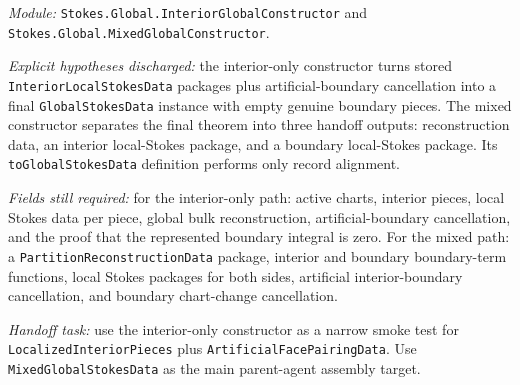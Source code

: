 \begin{definition}
  \label{anc:m6_interior_mixed_constructors}
  \leanok
  \emph{Module:} \texttt{Stokes.Global.InteriorGlobalConstructor} and
  \texttt{Stokes.Global.MixedGlobalConstructor}.

  \emph{Explicit hypotheses discharged:}
  the interior-only constructor turns stored \texttt{InteriorLocalStokesData}
  packages plus artificial-boundary cancellation into a final
  \texttt{GlobalStokesData} instance with empty genuine boundary pieces.  The
  mixed constructor separates the final theorem into three handoff outputs:
  reconstruction data, an interior local-Stokes package, and a boundary
  local-Stokes package.  Its \texttt{toGlobalStokesData} definition performs
  only record alignment.

  \emph{Fields still required:}
  for the interior-only path: active charts, interior pieces, local Stokes data
  per piece, global bulk reconstruction, artificial-boundary cancellation, and
  the proof that the represented boundary integral is zero.  For the mixed
  path: a \texttt{PartitionReconstructionData} package, interior and boundary
  boundary-term functions, local Stokes packages for both sides, artificial
  interior-boundary cancellation, and boundary chart-change cancellation.

  \emph{Handoff task:}
  use the interior-only constructor as a narrow smoke test for
  \texttt{LocalizedInteriorPieces} plus \texttt{ArtificialFacePairingData}.
  Use \texttt{MixedGlobalStokesData} as the main parent-agent assembly target.
\end{definition}

